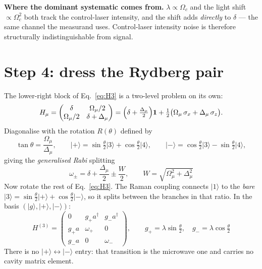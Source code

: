 \documentclass[11pt,a4paper]{article}
\newcommand{\ket}[1]{\lvert #1 \rangle}
\newcommand{\dg}{^{\dagger}}
\newcommand{\Om}{\Omega}
\newcommand{\Omu}{\Omega_{\mu}}
\newcommand{\Dmu}{\Delta_{\mu}}
\begin{document}
\begin{keybox}
\textbf{Where the dominant systematic comes from.} $\lambda\propto\Om_c$ and the light shift
$\propto\Om_c^2$ both track the control-laser intensity, and the shift adds \emph{directly} to
$\delta$ --- the same channel the measurand uses. Control-laser intensity noise is therefore
structurally indistinguishable from signal.
\end{keybox}

\section{Step 4: dress the Rydberg pair}

The lower-right block of Eq.~\eqref{eq:H3} is a two-level problem on its own:
\begin{equation}
  H_\mu=\begin{pmatrix}\delta & \Omu/2\\ \Omu/2 & \delta+\Dmu\end{pmatrix}
      = \Bigl(\delta+\tfrac{\Dmu}{2}\Bigr)\mathbf{1}
        + \tfrac12\bigl(\Omu\,\sigma_x + \Dmu\,\sigma_z\bigr).
\end{equation}
Diagonalise with the rotation $R(\theta)$ defined by
\begin{equation}
  \tan\theta = \frac{\Omu}{\Dmu},
  \qquad
  \ket{+} = \sin\tfrac\theta2\ket{3}+\cos\tfrac\theta2\ket{4},
  \qquad
  \ket{-} = \cos\tfrac\theta2\ket{3}-\sin\tfrac\theta2\ket{4},
\end{equation}
giving the \emph{generalised Rabi} splitting
\begin{equation}
  \boxed{\ \omega_\pm=\delta+\frac{\Dmu}{2}\pm\frac{W}{2},
  \qquad W=\sqrt{\Omu^{2}+\Dmu^{2}}\ }
  \label{eq:branches}
\end{equation}
Now rotate the rest of Eq.~\eqref{eq:H3}. The Raman coupling connects $\ket{1}$ to the
\emph{bare} $\ket{3}=\sin\tfrac\theta2\ket{+}+\cos\tfrac\theta2\ket{-}$, so it splits between
the branches in that ratio. In the basis $(\ket{g},\ket{+},\ket{-})$:
\begin{equation}
  \boxed{\;
  H^{(3)}=\begin{pmatrix}
    0 & g_+ a\dg & g_- a\dg\\[3pt]
    g_+ a & \omega_+ & 0\\[3pt]
    g_- a & 0 & \omega_-
  \end{pmatrix},
  \qquad
  g_+=\lambda\sin\tfrac\theta2,\quad g_-=\lambda\cos\tfrac\theta2 \;}
  \label{eq:core}
\end{equation}
There is no $\ket{+}\!\leftrightarrow\!\ket{-}$ entry: that transition is the microwave one and
carries no cavity matrix element.
\end{document}
